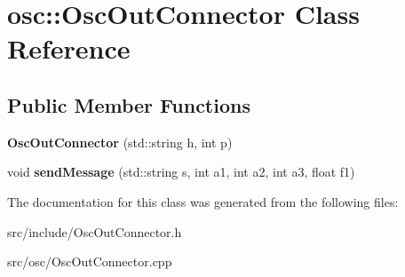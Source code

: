 \hypertarget{classosc_1_1OscOutConnector}{\section{osc\-:\-:Osc\-Out\-Connector Class Reference}
\label{classosc_1_1OscOutConnector}
}
\subsection*{Public Member Functions}
\begin{DoxyCompactItemize}
\item 
\hypertarget{classosc_1_1OscOutConnector_a7dde00203135c4a673e56f02dec774b4}{{\bfseries Osc\-Out\-Connector} (std\-::string h, int p)}\label{classosc_1_1OscOutConnector_a7dde00203135c4a673e56f02dec774b4}

\item 
\hypertarget{classosc_1_1OscOutConnector_a8b3bcadf0295998b42753161ae9d17ee}{void {\bfseries send\-Message} (std\-::string s, int a1, int a2, int a3, float f1)}\label{classosc_1_1OscOutConnector_a8b3bcadf0295998b42753161ae9d17ee}

\end{DoxyCompactItemize}


The documentation for this class was generated from the following files\-:\begin{DoxyCompactItemize}
\item 
src/include/Osc\-Out\-Connector.\-h\item 
src/osc/Osc\-Out\-Connector.\-cpp\end{DoxyCompactItemize}
